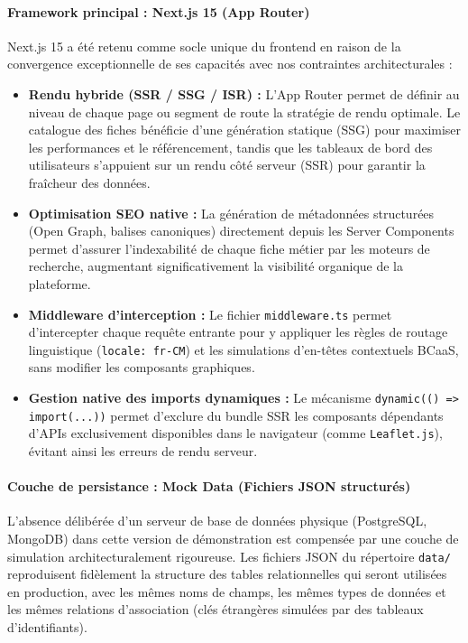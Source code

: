 \documentclass[12pt,a4paper]{report}
\begin{document}
\paragraph{Framework principal : Next.js 15 (App Router)}

\noindent
Next.js 15 a été retenu comme socle unique du frontend en raison de la convergence exceptionnelle de ses capacités avec nos contraintes architecturales :

\begin{itemize}[leftmargin=1.5cm, itemsep=5pt]
    \item \textbf{Rendu hybride (SSR / SSG / ISR) :} L'App Router permet de définir au niveau de chaque page ou segment de route la stratégie de rendu optimale. Le catalogue des fiches bénéficie d'une génération statique (SSG) pour maximiser les performances et le référencement, tandis que les tableaux de bord des utilisateurs s'appuient sur un rendu côté serveur (SSR) pour garantir la fraîcheur des données.
    \item \textbf{Optimisation SEO native :} La génération de métadonnées structurées (Open Graph, balises canoniques) directement depuis les Server Components permet d'assurer l'indexabilité de chaque fiche métier par les moteurs de recherche, augmentant significativement la visibilité organique de la plateforme.
    \item \textbf{Middleware d'interception :} Le fichier \texttt{middleware.ts} permet d'intercepter chaque requête entrante pour y appliquer les règles de routage linguistique (\texttt{locale: fr-CM}) et les simulations d'en-têtes contextuels BCaaS, sans modifier les composants graphiques.
    \item \textbf{Gestion native des imports dynamiques :} Le mécanisme \texttt{dynamic(() => import(...))} permet d'exclure du bundle SSR les composants dépendants d'APIs exclusivement disponibles dans le navigateur (comme \texttt{Leaflet.js}), évitant ainsi les erreurs de rendu serveur.
\end{itemize}

\paragraph{Couche de persistance : Mock Data (Fichiers JSON structurés)}

\noindent
L'absence délibérée d'un serveur de base de données physique (PostgreSQL, MongoDB) dans cette version de démonstration est compensée par une couche de simulation architecturalement rigoureuse. Les fichiers JSON du répertoire \texttt{data/} reproduisent fidèlement la structure des tables relationnelles qui seront utilisées en production, avec les mêmes noms de champs, les mêmes types de données et les mêmes relations d'association (clés étrangères simulées par des tableaux d'identifiants).
\end{document}
